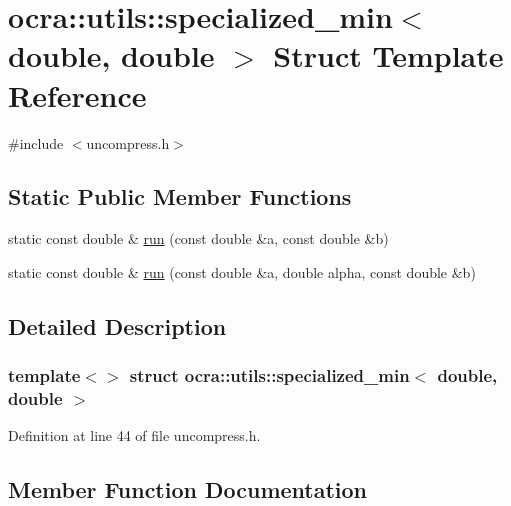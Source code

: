 \hypertarget{structocra_1_1utils_1_1specialized__min_3_01double_00_01double_01_4}{}\section{ocra\+:\+:utils\+:\+:specialized\+\_\+min$<$ double, double $>$ Struct Template Reference}
\label{structocra_1_1utils_1_1specialized__min_3_01double_00_01double_01_4}


{\ttfamily \#include $<$uncompress.\+h$>$}

\subsection*{Static Public Member Functions}
\begin{DoxyCompactItemize}
\item 
static const double \& \hyperlink{structocra_1_1utils_1_1specialized__min_3_01double_00_01double_01_4_a846635806abbd79b2039e4e67518c909}{run} (const double \&a, const double \&b)
\item 
static const double \& \hyperlink{structocra_1_1utils_1_1specialized__min_3_01double_00_01double_01_4_ab6fb30f9ef59133eb89e51c388c84409}{run} (const double \&a, double alpha, const double \&b)
\end{DoxyCompactItemize}


\subsection{Detailed Description}
\subsubsection*{template$<$$>$\newline
struct ocra\+::utils\+::specialized\+\_\+min$<$ double, double $>$}



Definition at line 44 of file uncompress.\+h.



\subsection{Member Function Documentation}
\hypertarget{structocra_1_1utils_1_1specialized__min_3_01double_00_01double_01_4_a846635806abbd79b2039e4e67518c909}{}\label{structocra_1_1utils_1_1specialized__min_3_01double_00_01double_01_4_a846635806abbd79b2039e4e67518c909} 
